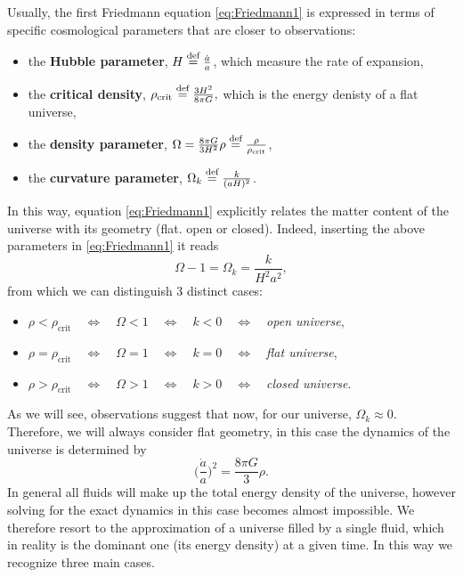 Usually, the first Friedmann equation \eqref{eq:Friedmann1} is expressed in terms of specific cosmological parameters that are closer to observations:
\begin{itemize}
    \item the \textbf{Hubble parameter}, $H\stackrel{\text{def}}{=}\frac{\dot a}{a}$, which measure the rate of expansion,
    \item the \textbf{critical density}, $\rho_{\text{crit}}\stackrel{\text{def}}{=}\frac{3H^2}{8\pi G},$ which is the energy denisty of a flat universe,
    \item the \textbf{density parameter}, $\Omega=\frac{8\pi G}{3H^2}\rho\stackrel{\text{def}}{=}\frac{\rho}{\rho_{\text{crit}}}$, 
    \item the \textbf{curvature parameter}, $\Omega_k\stackrel{\text{def}}{=}\frac{k}{(aH)^2}$.
\end{itemize}
In this way, equation \eqref{eq:Friedmann1} explicitly relates the matter content of the universe with its geometry (flat. open or closed). Indeed, inserting the above parameters in \eqref{eq:Friedmann1} it reads
\begin{equation}\label{eq:Friedmann_Omega}
    \boxed{\Omega-1=\Omega_k=\frac{k}{H^2a^2}},
\end{equation}
from which we can distinguish 3 distinct cases:
\begin{itemize}
    \item $\rho<\rho_{\text{crit}}\quad\Leftrightarrow\quad \Omega<1 \quad\Leftrightarrow\quad k<0 \quad\Leftrightarrow\quad $\emph{open universe},
    \item  $\rho=\rho_{\text{crit}}\quad\Leftrightarrow\quad \Omega=1 \quad\Leftrightarrow\quad k=0 \quad\Leftrightarrow\quad $\emph{flat universe},
    \item  $\rho>\rho_{\text{crit}}\quad\Leftrightarrow\quad \Omega>1 \quad\Leftrightarrow\quad k>0 \quad\Leftrightarrow\quad $\emph{closed universe}.
\end{itemize} 
As we will see, observations suggest that now, for our universe, $\Omega_k\approx0$. Therefore, we will always consider flat geometry, in this case the dynamics of the universe is determined by $$\bigg(\frac{\dot a }{a}\bigg)^2=\frac{8\pi G}{3}\rho. $$
In general all fluids will make up the total energy density of the universe, however solving for the exact dynamics in this case becomes almost impossible. We therefore resort to the approximation of a universe filled by a single fluid, which in reality is the dominant one (its energy density) at a given time. In this way we recognize three main cases. 
